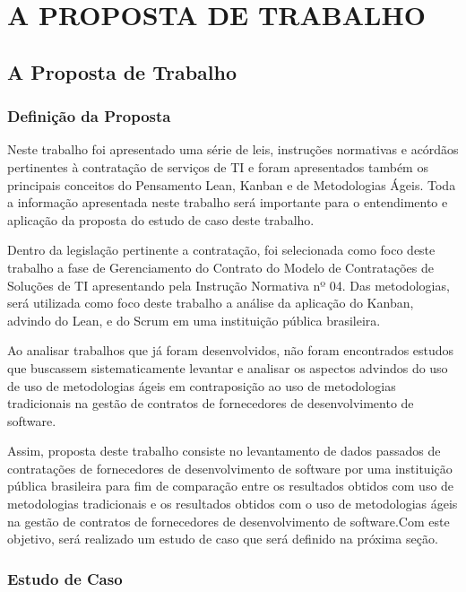 \part{A PROPOSTA DE TRABALHO}

\chapter[A Proposta de Trabalho]{A Proposta de Trabalho}

\section[Definição da Proposta]{Definição da Proposta}

Neste trabalho foi apresentado uma série de leis, instruções normativas e acórdãos pertinentes à contratação de serviços de TI e foram apresentados também os principais conceitos do Pensamento Lean, Kanban e de Metodologias Ágeis. Toda a informação apresentada neste trabalho será importante para o entendimento e aplicação da proposta do estudo de caso deste trabalho.

Dentro da legislação pertinente a contratação, foi selecionada como foco deste trabalho a fase de Gerenciamento do Contrato do Modelo de Contratações de Soluções de TI apresentando pela Instrução Normativa nº 04. Das metodologias, será utilizada como foco deste trabalho a análise da aplicação do Kanban, advindo do Lean,  e do Scrum em uma instituição pública brasileira. 

Ao analisar trabalhos que já foram desenvolvidos, não foram encontrados estudos que buscassem sistematicamente levantar e analisar os aspectos advindos do uso de uso de metodologias ágeis em contraposição ao uso de metodologias tradicionais na gestão de contratos de fornecedores de desenvolvimento de software.

Assim, proposta deste trabalho consiste no levantamento de dados passados de contratações de fornecedores de desenvolvimento de software por uma instituição pública brasileira para fim de comparação entre os resultados obtidos com uso de metodologias tradicionais e os resultados obtidos com o uso de metodologias ágeis na gestão de contratos de fornecedores de desenvolvimento de software.Com este objetivo, será realizado um estudo de caso que será definido na próxima seção.


\section[Estudo de Caso]{Estudo de Caso}

